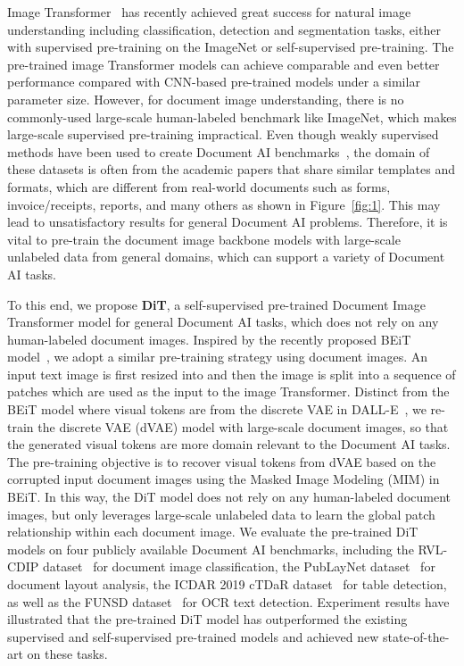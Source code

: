 \documentclass[sigconf]{acmart}
\begin{document}
Image Transformer~\citep{dosovitskiy2020vit,touvron2020deit,liu2021swin,chen2021empirical,bao2021beit,elnouby2021xcit,he2021masked,zhou2021ibot} has recently achieved great success for natural image understanding including classification, detection and segmentation tasks, either with supervised pre-training on the ImageNet or self-supervised pre-training. The pre-trained image Transformer models can achieve comparable and even better performance compared with CNN-based pre-trained models under a similar parameter size. However, for document image understanding, there is no commonly-used large-scale human-labeled benchmark like ImageNet, which makes large-scale supervised pre-training impractical. Even though weakly supervised methods have been used to create Document AI benchmarks~\citep{zhong2019publaynet,zhong2020imagebased,li-etal-2020-tablebank,li-etal-2020-docbank}, the domain of these datasets is often from the academic papers that share similar templates and formats, which are different from real-world documents such as forms, invoice/receipts, reports, and many others as shown in Figure~\ref{fig:1}. This may lead to unsatisfactory results for general Document AI problems. Therefore, it is vital to pre-train the document image backbone models with large-scale unlabeled data from general domains, which can support a variety of Document AI tasks.


To this end, we propose \textbf{DiT}, a self-supervised pre-trained Document Image Transformer model for general Document AI tasks, which does not rely on any human-labeled document images. Inspired by the recently proposed BEiT model~\citep{bao2021beit}, we adopt a similar pre-training strategy using document images. An input text image is first resized into  and then the image is split into a sequence of  patches which are used as the input to the image Transformer. Distinct from the BEiT model where visual tokens are from the discrete VAE in DALL-E~\citep{ramesh2021zeroshot}, we re-train the discrete VAE (dVAE) model with large-scale document images, so that the generated visual tokens are more domain relevant to the Document AI tasks. The pre-training objective is to recover visual tokens from dVAE based on the corrupted input document images using the Masked Image Modeling (MIM) in BEiT. In this way, the DiT model does not rely on any human-labeled document images, but only leverages large-scale unlabeled data to learn the global patch relationship within each document image. We evaluate the pre-trained DiT models on four publicly available Document AI benchmarks, including the RVL-CDIP dataset~\citep{harley2015icdar} for document image classification, the PubLayNet dataset~\citep{zhong2019publaynet} for document layout analysis, the ICDAR 2019 cTDaR dataset~\citep{8978120} for table detection, as well as the FUNSD dataset~\citep{Jaume2019FUNSDAD} for OCR text detection. Experiment results have illustrated that the pre-trained DiT model has outperformed the existing supervised and self-supervised pre-trained models and achieved new state-of-the-art on these tasks.
\end{document}

